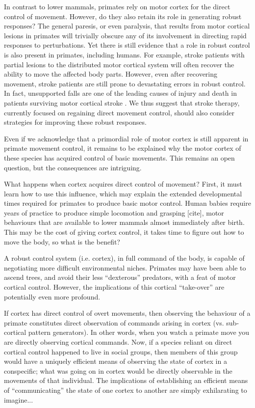 In contrast to lower mammals, primates rely on motor cortex for the direct control of movement. However, do they also retain its role in generating robust responses? The general paresis, or even paralysis, that results from motor cortical lesions in primates will trivially obscure any of its involvement in directing rapid responses to perturbations. Yet there is still evidence that a role in robust control is also present in primates, including humans. For example, stroke patients with partial lesions to the distributed motor cortical system will often recover the ability to move the affected body parts. However, even after recovering movement, stroke patients are still prone to devastating errors in robust control. In fact, unsupported falls are one of the leading causes of injury and death in patients surviving motor cortical stroke \cite{Jacobs2014}. We thus suggest that stroke therapy, currently focused on regaining direct movement control, should also consider strategies for improving these robust responses.

Even if we acknowledge that a primordial role of motor cortex is still apparent in primate movement control, it remains to be explained why the motor cortex of these species has acquired control of basic movements. This remains an open question, but the consequences are intriguing.


What happens when cortex acquires direct control of movement? First, it must learn how to use this influence, which may explain the extended developmental times required for primates to produce basic motor control. Human babies require years of practice to produce simple locomotion and grasping [cite], motor behaviours that are available to lower mammals almost immediately after birth. This may be the cost of giving cortex control, it takes time to figure out how to move the body, so what is the benefit? 

A robust control system (i.e. cortex), in full command of the body, is capable of negotiating more difficult environmental niches. Primates may have been able to ascend trees, and avoid their less ``dexterous'' predators, with a feat of motor cortical control. However, the implications of this cortical ``take-over'' are potentially even more profound. 

If cortex has direct control of overt movements, then observing the behaviour of a primate constitutes direct observation of commands arising in cortex (vs. sub-cortical pattern generators). In other words, when you watch a primate move you are directly observing cortical commands. Now, if a species reliant on direct cortical control happened to live in social groups, then members of this group would have a uniquely efficient means of observing the state of cortex in a conspecific; what was going on in cortex would be directly observable in the movements of that individual. The implications of establishing an efficient means of ``communicating'' the state of one cortex to another are simply exhilarating to imagine...

